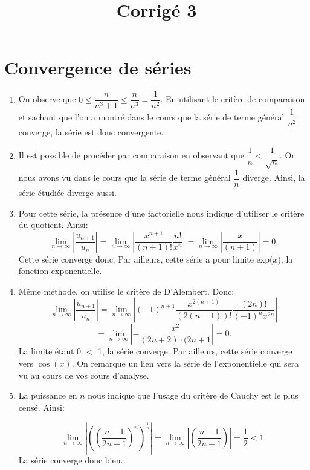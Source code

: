 \documentclass[a4paper, 12pt, french, twoside]{article}
\title{Corrigé 3}
\begin{document}
\maketitle

\section{Convergence de séries}

\begin{enumerate}
    \item On observe que $0\leq\dfrac{n}{n^3+1}\leq \dfrac{n}{n^3}=\dfrac{1}{n^2} $. En utilisant le critère de comparaison et sachant que l'on a montré dans le cours que la série de terme général $\dfrac{1}{n^2}$ converge, la série est donc convergente.
    \item Il est possible de procéder par comparaison en observant que $\dfrac{1}{n}\leq \dfrac{1}{\sqrt{n}}$. Or nous avons vu dans le cours que la série de terme général $\dfrac{1}{n}$ diverge. Ainsi, la série étudiée diverge aussi.
    \item Pour cette série, la présence d'une factorielle nous indique d'utiliser le critère du quotient. Ainsi:
    \begin{equation}
        \lim_{n\to \infty}\left| \dfrac{u_{n+1}}{u_n}\right| =\lim_{n\to \infty} \left|  \dfrac{x^{n+1}}{(n+1)!}  \dfrac{n!}{x^n}  \right |=\lim_{n\to \infty} \left|  \dfrac{x}{(n+1)} \right |=0.
    \end{equation}
    Cette série converge donc. Par ailleurs, cette série a pour limite exp($x$), la fonction exponentielle.
    
    \item Même méthode, on utilise le critère de D'Alembert. Donc: 
    \begin{equation}
        \lim_{n\to \infty}\left| \dfrac{u_{n+1}}{u_n}\right| =\lim_{n\to \infty} \left|(-1)^{n+1} \dfrac{x^{2(n+1)}}{(2(n+1))!}\dfrac{(2n)!}{(-1)^{n} x^{2n}}\right|
    \end{equation}
    \begin{equation}
        =\lim_{n\to \infty}\left| - \dfrac{x^2}{(2n+2)\cdot (2n+1} \right|=0.
    \end{equation}
    La limite étant 0 $<$ 1, la série converge. Par ailleurs, cette série converge vers $\cos (x)$. On remarque un lien vers la série de l'exponentielle qui sera vu au cours de vos cours d'analyse. 
    \item La puissance en $n$ nous indique que l'usage du critère de Cauchy est le plus censé. Ainsi:

    \begin{equation}
        \lim_{n\to \infty}\left| \left(  \left (\dfrac{n-1}{2n+1}\right )^n\right)^{\frac{1}{n}}  \right |= \lim_{n\to \infty}\left|   \left (\dfrac{n-1}{2n+1}\right )  \right |=\dfrac{1}{2}<1.
    \end{equation}
    La série converge donc bien.
\end{enumerate}
\end{document}
